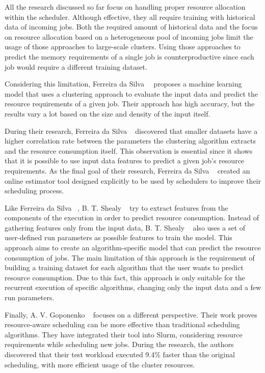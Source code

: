 All the research discussed so far focus on handling proper resource allocation within the scheduler.
Although effective, they all require training with historical data of incoming jobs.
Both the required amount of historical data and the focus on resource allocation based on a heterogeneous pool of incoming jobs limit the usage of those approaches to large-scale clusters.
Using those approaches to predict the memory requirements of a single job is counterproductive since each job would require a different training dataset.

Considering this limitation, Ferreira da Silva~\etal~\cite{ferreira2013} proposes a machine learning model that uses a clustering approach to evaluate the input data and predict the resource requirements of a given job.
Their approach has high accuracy, but the results vary a lot based on the size and density of the input itself.

During their research, Ferreira da Silva \etal~\cite{ferreira2013} discovered that smaller datasets have a higher correlation rate between the parameters the clustering algorithm extracts and the resource consumption itself.
This observation is essential since it shows that it is possible to use input data features to predict a given job's resource requirements.
As the final goal of their research, Ferreira da Silva \etal~\cite{ferreira2013} created an online estimator tool designed explicitly to be used by schedulers to improve their scheduling process.

Like Ferreira da Silva \etal~\cite{ferreira2013}, B. T. Shealy \etal~\cite{shealy2021} try to extract features from the components of the execution in order to predict resource consumption.
Instead of gathering features only from the input data, B. T. Shealy \etal~\cite{shealy2021} also uses a set of user-defined run parameters as possible features to train the model.
This approach aims to create an algorithm-specific model that can predict the resource consumption of jobs.
The main limitation of this approach is the requirement of building a training dataset for each algorithm that the user wants to predict resource consumption.
Due to this fact, this approach is only suitable for the recurrent execution of specific algorithms, changing only the input data and a few run parameters.

Finally, A. V. Goponenko \etal~\cite{goponenko2020} focuses on a different perspective.
Their work proves resource-aware scheduling can be more effective than traditional scheduling algorithms.
They have integrated their tool into Slurm, considering resource requirements while scheduling new jobs.
During the research, the authors discovered that their test workload executed 9.4\% faster than the original scheduling, with more efficient usage of the cluster resources.
